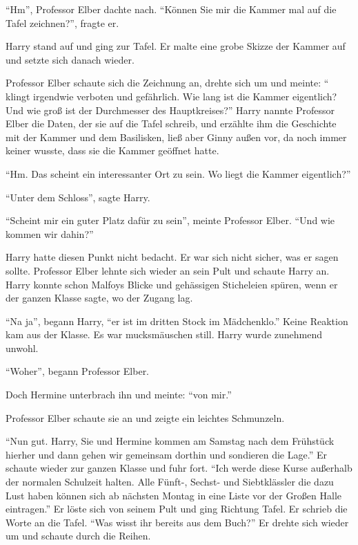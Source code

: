 \enquote{Hm}, Professor Elber dachte nach. \enquote{Können Sie mir die Kammer mal auf die Tafel zeichnen?}, fragte er.

Harry stand auf und ging zur Tafel. Er malte eine grobe Skizze der Kammer auf und setzte sich danach wieder.

Professor Elber schaute sich die Zeichnung an, drehte sich um und meinte: \enquote{ \gst klingt irgendwie verboten und gefährlich. Wie lang ist die Kammer eigentlich? Und wie groß ist der Durchmesser des Hauptkreises?} Harry nannte Professor Elber die Daten, der sie auf die Tafel schreib, und erzählte ihm die Geschichte mit der Kammer und dem Basilisken, ließ aber Ginny außen vor, da noch immer keiner wusste, dass sie die Kammer geöffnet hatte.

\enquote{Hm. Das scheint ein interessanter Ort zu sein. Wo liegt die Kammer eigentlich?}

\enquote{Unter dem Schloss}, sagte Harry.

\enquote{Scheint mir ein guter Platz dafür zu sein}, meinte Professor Elber. \enquote{Und wie kommen wir dahin?}

Harry hatte diesen Punkt nicht bedacht. Er war sich nicht sicher, was er sagen sollte. Professor Elber lehnte sich wieder an sein Pult und schaute Harry an. Harry konnte schon Malfoys Blicke und gehässigen Sticheleien spüren, wenn er der ganzen Klasse sagte, wo der Zugang lag.

\enquote{Na ja}, begann Harry, \enquote{er ist im dritten Stock \gst im Mädchenklo.} Keine Reaktion kam aus der Klasse. Es war mucksmäuschen still. Harry wurde zunehmend unwohl.

\enquote{Woher}, begann Professor Elber.

Doch Hermine unterbrach ihn und meinte: \enquote{von mir.}

Professor Elber schaute sie an und zeigte ein leichtes Schmunzeln.

\enquote{Nun gut. Harry, Sie und Hermine kommen am Samstag nach dem Frühstück hierher und dann gehen wir gemeinsam dorthin und sondieren die Lage.} Er schaute wieder zur ganzen Klasse und fuhr fort. \enquote{Ich werde diese Kurse außerhalb der normalen Schulzeit halten. Alle Fünft-, Sechst- und Siebtklässler die dazu Lust haben können sich ab nächsten Montag in eine Liste vor der Großen Halle eintragen.} Er löste sich von seinem Pult und ging Richtung Tafel. Er schrieb die Worte  an die Tafel. \enquote{Was wisst ihr bereits aus dem Buch?} Er drehte sich wieder um und schaute durch die Reihen.

